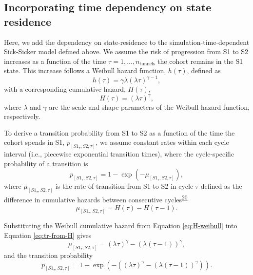 \documentclass[
]{article}
\begin{document}
\hypertarget{incorporating-time-dependency-on-state-residence}{%
\subsection{Incorporating time dependency on state residence}\label{incorporating-time-dependency-on-state-residence}}

Here, we add the dependency on state-residence to the simulation-time-dependent Sick-Sicker model defined above. We assume the risk of progression from S1 to S2 increases as a function of the time \(\tau = 1, \ldots, n_{\text{tunnels}}\) the cohort remains in the S1 state. This increase follows a Weibull hazard function, \(h(\tau)\), defined as
\[
  h(\tau) = \gamma \lambda (\lambda \tau)^{\gamma-1},
\]
with a corresponding cumulative hazard, \(H(\tau)\),
\begin{equation}
  H(\tau) = (\lambda \tau)^{\gamma},
\label{eq:H-weibull}
\end{equation}
where \(\lambda\) and \(\gamma\) are the scale and shape parameters of the Weibull hazard function, respectively.

To derive a transition probability from S1 to S2 as a function of the time the cohort spends in S1, \(p_{\left[S1_{\tau},S2, \tau\right]}\), we assume constant rates within each cycle interval (i.e., piecewise exponential transition times), where the cycle-specific probability of a transition is
\begin{equation}
  p_{\left[S1_{\tau},S2, \tau\right]} = 1-\exp{\left(-\mu_{\left[S1_{\tau},S2, \tau\right]}\right)},
\label{eq:tp-from-rate}
\end{equation}
where \(\mu_{\left[S1_{\tau},S2, \tau\right]}\) is the rate of transition from S1 to S2 in cycle \(\tau\) defined as the difference in cumulative hazards between consecutive cycles\textsuperscript{\protect\hyperlink{ref-Diaby2014}{20}}
\begin{equation}
  \mu_{\left[S1_{\tau},S2, \tau\right]} = H(\tau) - H(\tau-1).
\label{eq:tr-from-H}
\end{equation}

Substituting the Weibull cumulative hazard from Equation \eqref{eq:H-weibull} into Equation \eqref{eq:tr-from-H} gives
\begin{equation}
  \mu_{\left[S1_{\tau},S2, \tau\right]} = (\lambda \tau)^{\gamma} - (\lambda (\tau-1))^{\gamma},
\label{eq:tr-from-H-weibull}
\end{equation}
and the transition probability
\begin{equation}
  p_{\left[S1_{\tau},S2, \tau\right]} = 1-\exp{\left(- \left((\lambda \tau)^{\gamma} - (\lambda (\tau-1))^{\gamma}\right) \right)}.
\label{eq:tp-from-H-weibull}
\end{equation}
\end{document}

